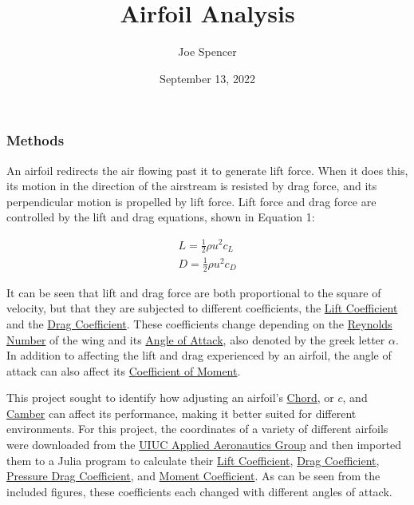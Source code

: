 \documentclass{article}
\begin{document}
\author{Joe Spencer}
\title{Airfoil Analysis}
\date{September 13, 2022}
\maketitle

\subsubsection*{Methods}

An airfoil redirects the air flowing past it to generate lift force. When it does this, its motion in the direction of the airstream is resisted by drag force, and its perpendicular motion is propelled by lift force. Lift force and drag force are controlled by the lift and drag equations, shown in Equation 1:

\begin{equation} \label{eq:1}
\begin{aligned}
        	L = \frac{1}{2} \rho u^{2} c_{L} \\
        	D = \frac{1}{2} \rho u^{2} c_{D}
\end{aligned}
\end{equation}
	
It can be seen that lift and drag force are both proportional to the square of velocity, but that they are subjected to different coefficients, the \hyperlink{CL}{Lift Coefficient} and the \hyperlink{CD}{Drag Coefficient}. These coefficients change depending on the \hyperlink{Re}{Reynolds Number} of the wing and its \hyperlink{alpha}{Angle of Attack}, also denoted by the greek letter $\alpha$. In addition to affecting the lift and drag experienced by an airfoil, the angle of attack can also affect its \hyperlink{CM}{Coefficient of Moment}.\newline

This project sought to identify how adjusting an airfoil's \hyperlink{c}{Chord}, or $c$, and \hyperlink{Camber}{Camber} can affect its performance, making it better suited for different environments. For this project, the coordinates of a variety of different airfoils were downloaded from the \href{https://m-selig.ae.illinois.edu/ads.html}{UIUC Applied Aeronautics Group} and then imported them to a Julia program to calculate their \hyperlink{CL}{Lift Coefficient}, \hyperlink{CD}{Drag Coefficient}, \hyperlink{DP}{Pressure Drag Coefficient}, and \hyperlink{CM}{Moment Coefficient}. As can be seen from the included figures, these coefficients each changed with different angles of attack.\newline
\end{document}
